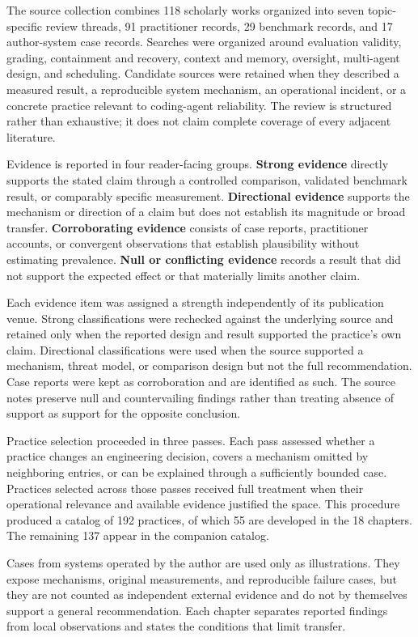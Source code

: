 The source collection combines 118 scholarly works organized into seven topic-specific review threads, 91 practitioner records, 29 benchmark records, and 17 author-system case records. Searches were organized around evaluation validity, grading, containment and recovery, context and memory, oversight, multi-agent design, and scheduling. Candidate sources were retained when they described a measured result, a reproducible system mechanism, an operational incident, or a concrete practice relevant to coding-agent reliability. The review is structured rather than exhaustive; it does not claim complete coverage of every adjacent literature.

Evidence is reported in four reader-facing groups. \textbf{Strong evidence} directly supports the stated claim through a controlled comparison, validated benchmark result, or comparably specific measurement. \textbf{Directional evidence} supports the mechanism or direction of a claim but does not establish its magnitude or broad transfer. \textbf{Corroborating evidence} consists of case reports, practitioner accounts, or convergent observations that establish plausibility without estimating prevalence. \textbf{Null or conflicting evidence} records a result that did not support the expected effect or that materially limits another claim.

Each evidence item was assigned a strength independently of its publication venue. Strong classifications were rechecked against the underlying source and retained only when the reported design and result supported the practice's own claim. Directional classifications were used when the source supported a mechanism, threat model, or comparison design but not the full recommendation. Case reports were kept as corroboration and are identified as such. The source notes preserve null and countervailing findings rather than treating absence of support as support for the opposite conclusion.

Practice selection proceeded in three passes. Each pass assessed whether a practice changes an engineering decision, covers a mechanism omitted by neighboring entries, or can be explained through a sufficiently bounded case. Practices selected across those passes received full treatment when their operational relevance and available evidence justified the space. This procedure produced a catalog of 192 practices, of which 55 are developed in the 18 chapters. The remaining 137 appear in the companion catalog.

Cases from systems operated by the author are used only as illustrations. They expose mechanisms, original measurements, and reproducible failure cases, but they are not counted as independent external evidence and do not by themselves support a general recommendation. Each chapter separates reported findings from local observations and states the conditions that limit transfer.


